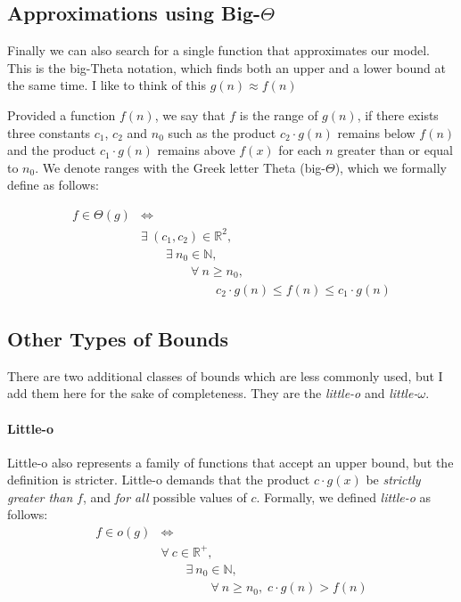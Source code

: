 \documentclass{aldast}
\begin{document}
\subsection{Approximations using Big-$\Theta$}

Finally we can also search for a single function that approximates our
model. This is the big-Theta notation, which finds both an upper and a
lower bound at the same time. I like to think of this
$ g(n) \approx f(n)$


Provided a function $f(n)$, we say that $f$ is the range of $g(n)$, if
there exists three constants $c_1$, $c_2$ and $n_0$ such as the
product $c_2 \cdot g(n)$ remains below $f(n)$ and the product
$c_1 \cdot g(n)$ remains above $f(x)$ for each $n$ greater than or
equal to $n_0$. We denote ranges with the Greek letter Theta
(big-$\Theta$), which we formally define as follows:

\begin{equation*}
  \begin{split}
  f \in \Theta(g) & \iff \\
  & \exists \: (c_1, c_2) \in \mathbb{R}^2, \\
  & \qquad \exists \: n_0 \in \mathbb{N}, \\
  & \qquad \qquad \forall \: n \geq n_0, \\
  & \qquad \qquad \qquad c_2 \cdot g(n) \leq f(n) \leq c_1 \cdot g(n)
  \end{split}
\end{equation*}

\subsection{Other Types of Bounds}

There are two additional classes of bounds which are less commonly
used, but I add them here for the sake of completeness. They are the
\emph{little-o} and \emph{little-$\omega$}.

\paragraph{Little-o} Little-o also represents a family of functions
that accept an upper bound, but the definition is stricter. Little-o
demands that the product $c \cdot g(x)$ be \emph{strictly greater
  than} $f$, and \emph{for all} possible values of $c$.  Formally, we
defined \emph{little-o} as follows:
\begin{equation*}
  \begin{split}
    f \in o(g) & \iff \\
    & \forall \: c \in \mathbb{R}^+, \\
    & \qquad \exists \: n_0 \in \mathbb{N}, \\
    & \qquad \qquad \forall \: n \geq n_0, \; c \cdot g(n) > f(n)
  \end{split}
\end{equation*}
  
\end{document}
